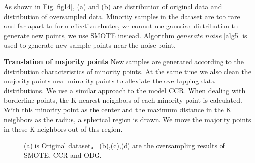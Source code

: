 \documentclass[ida]{iosart2x}
\begin{document}
As shown in Fig.\ref{fig14}, (a) and (b) are distribution of original data and 
distribution of oversampled data.
Minority samples in the dataset are too rare and far apart to form effective cluster, we cannot use
gaussian distribution to generate new points, we use SMOTE instead.
Algorithm $generate\_noise$ \ref{alg5} is used to generate new sample points near the noise point.

\textbf{Translation of majority points}
New samples are generated according to the 
distribution characteristics of minority points. 
At the same time we also clean the majority points
 near minority points to alleviate the overlapping data distributions.
We use a similar approach to the model CCR\cite{2017CCR}.
When dealing with borderline points, 
the K nearest neighbors of each minority point is calculated. 
With this minority point as the center and the maximum distance in the K neighbors as the radius, 
a spherical region is drawn. We move the majority points in these K neighbors out of this region.

\begin{figure}[tb]
  \centering
  \quad
  \quad
  \quad
  \caption{(a) is Original dataset。
  (b),(c),(d) are the oversampling results of SMOTE, CCR and ODG.}
  \label{fig18}
  \end{figure}
\end{document}
